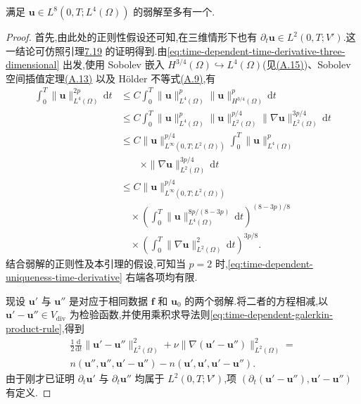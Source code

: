 \begin{lemma}[在更强正则性假设下弱解的唯一性]\label{lem:time-dependent-weak-solution-uniqueness}
满足 $\bm{u}\in L^8(0,T;L^4(\Omega))$ 的弱解至多有一个.
\begin{proof}
首先,由此处的正则性假设还可知,在三维情形下也有
$\partial_t\bm{u}\in L^2(0,T;V')$.这一结论可仿照引理\hyperref[lem:time-dependent-time-derivative-regularity]{7.19} 的证明得到.由\cref{eq:time-dependent-time-derivative-three-dimensional} 出发,使用 Sobolev 嵌入 $H^{3/4}(\Omega)\hookrightarrow L^4(\Omega)$(见\hyperref[eq:appendix-a-15]{(A.15)})、Sobolev 空间插值定理\hyperref[eq:appendix-a-13]{(A.13)} 以及 Hölder 不等式\hyperref[eq:appendix-a-9]{(A.9)},有
\begin{equation}\label{eq:time-dependent-uniqueness-time-derivative}
\begin{aligned}
  \int_0^T\|\bm{u}\|_{L^4(\Omega)}^{2p}\,\mathrm{d}t
  &\le C\int_0^T\|\bm{u}\|_{L^4(\Omega)}^p
                  \|\bm{u}\|_{H^{3/4}(\Omega)}^p\,\mathrm{d}t\\
  &\le C\int_0^T\|\bm{u}\|_{L^4(\Omega)}^p
                  \|\bm{u}\|_{L^2(\Omega)}^{p/4}
                  \|\nabla\bm{u}\|_{L^2(\Omega)}^{3p/4}\,\mathrm{d}t\\
  &\le C\|\bm{u}\|_{L^\infty(0,T;L^2(\Omega))}^{p/4}
       \int_0^T\|\bm{u}\|_{L^4(\Omega)}^p\\
  &\qquad\times\|\nabla\bm{u}\|_{L^2(\Omega)}^{3p/4}\,\mathrm{d}t\\
  &\le C\|\bm{u}\|_{L^\infty(0,T;L^2(\Omega))}^{p/4}\\
  &\quad\times\left(\int_0^T
         \|\bm{u}\|_{L^4(\Omega)}^{8p/(8-3p)}\,\mathrm{d}t
       \right)^{(8-3p)/8}\\
  &\quad\times
       \left(\int_0^T\|\nabla\bm{u}\|_{L^2(\Omega)}^2
                    \,\mathrm{d}t\right)^{3p/8}.
\end{aligned}
\end{equation}
结合弱解的正则性及本引理的假设,可知当 $p=2$ 时,\cref{eq:time-dependent-uniqueness-time-derivative} 右端各项均有限.

现设 $\bm{u}'$ 与 $\bm{u}''$ 是对应于相同数据 $\bm{f}$ 和 $\bm{u}_0$ 的两个弱解.将二者的方程相减,以 $\bm{u}'-\bm{u}''\in V_{\mathrm{div}}$ 为检验函数,并使用乘积求导法则\cref{eq:time-dependent-galerkin-product-rule},得到
\begin{equation}\label{eq:time-dependent-uniqueness-difference-energy}
\begin{gathered}
  \frac{1}{2}\frac{\mathrm{d}}{\mathrm{d}t}
       \|\bm{u}'-\bm{u}''\|_{L^2(\Omega)}^2
  +\nu\|\nabla(\bm{u}'-\bm{u}'')\|_{L^2(\Omega)}^2
  =\\
  n(\bm{u}'',\bm{u}'',\bm{u}'-\bm{u}'')
   -n(\bm{u}',\bm{u}',\bm{u}'-\bm{u}'').
\end{gathered}
\end{equation}
由于刚才已证明 $\partial_t\bm{u}'$ 与 $\partial_t\bm{u}''$ 均属于 $L^2(0,T;V')$,项
$(\partial_t(\bm{u}'-\bm{u}''),\bm{u}'-\bm{u}'')$ 有定义.


\end{proof}
\end{lemma}

